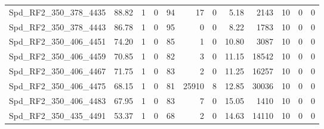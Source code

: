 \begin{longtable}[c]{@{}lrrrrrrrrrrr@{}}
Spd\_RF2\_350\_378\_4435     & 88.82                  & 1                       & 0                       & 94                     & 17                      & 0                       & 5.18                    & 2143                     & 10                       & 0                        & 0                        \\
Spd\_RF2\_350\_378\_4443     & 86.78                  & 1                       & 0                       & 95                     & 0                       & 0                       & 8.22                    & 1783                     & 10                       & 0                        & 0                        \\
Spd\_RF2\_350\_406\_4451     & 74.20                  & 1                       & 0                       & 85                     & 1                       & 0                       & 10.80                   & 3087                     & 10                       & 0                        & 0                        \\
Spd\_RF2\_350\_406\_4459     & 70.85                  & 1                       & 0                       & 82                     & 3                       & 0                       & 11.15                   & 18542                    & 10                       & 0                        & 0                        \\
Spd\_RF2\_350\_406\_4467     & 71.75                  & 1                       & 0                       & 83                     & 2                       & 0                       & 11.25                   & 16257                    & 10                       & 0                        & 0                        \\
Spd\_RF2\_350\_406\_4475     & 68.15                  & 1                       & 0                       & 81                     & 25910                   & 8                       & 12.85                   & 30036                    & 10                       & 0                        & 0                        \\
Spd\_RF2\_350\_406\_4483     & 67.95                  & 1                       & 0                       & 83                     & 7                       & 0                       & 15.05                   & 1410                     & 10                       & 0                        & 0                        \\
Spd\_RF2\_350\_435\_4491     & 53.37                  & 1                       & 0                       & 68                     & 2                       & 0                       & 14.63                   & 14110                    & 10                       & 0                        & 0                        \\

\end{longtable}
